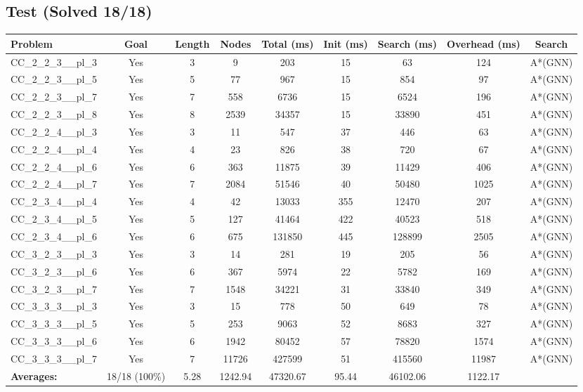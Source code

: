 \documentclass{article}
\begin{document}
\subsection*{Test (Solved 18/18)}
\begin{tabular}{lcccccccc}
\toprule
Problem & Goal & Length & Nodes & Total (ms) & Init (ms) & Search (ms) & Overhead (ms) & Search \\
\midrule
CC\_2\_2\_3\_\_pl\_3 & Yes & 3 & 9 & 203 & 15 & 63 & 124 & A*(GNN) \\
CC\_2\_2\_3\_\_pl\_5 & Yes & 5 & 77 & 967 & 15 & 854 & 97 & A*(GNN) \\
CC\_2\_2\_3\_\_pl\_7 & Yes & 7 & 558 & 6736 & 15 & 6524 & 196 & A*(GNN) \\
CC\_2\_2\_3\_\_pl\_8 & Yes & 8 & 2539 & 34357 & 15 & 33890 & 451 & A*(GNN) \\
CC\_2\_2\_4\_\_pl\_3 & Yes & 3 & 11 & 547 & 37 & 446 & 63 & A*(GNN) \\
CC\_2\_2\_4\_\_pl\_4 & Yes & 4 & 23 & 826 & 38 & 720 & 67 & A*(GNN) \\
CC\_2\_2\_4\_\_pl\_6 & Yes & 6 & 363 & 11875 & 39 & 11429 & 406 & A*(GNN) \\
CC\_2\_2\_4\_\_pl\_7 & Yes & 7 & 2084 & 51546 & 40 & 50480 & 1025 & A*(GNN) \\
CC\_2\_3\_4\_\_pl\_4 & Yes & 4 & 42 & 13033 & 355 & 12470 & 207 & A*(GNN) \\
CC\_2\_3\_4\_\_pl\_5 & Yes & 5 & 127 & 41464 & 422 & 40523 & 518 & A*(GNN) \\
CC\_2\_3\_4\_\_pl\_6 & Yes & 6 & 675 & 131850 & 445 & 128899 & 2505 & A*(GNN) \\
CC\_3\_2\_3\_\_pl\_3 & Yes & 3 & 14 & 281 & 19 & 205 & 56 & A*(GNN) \\
CC\_3\_2\_3\_\_pl\_6 & Yes & 6 & 367 & 5974 & 22 & 5782 & 169 & A*(GNN) \\
CC\_3\_2\_3\_\_pl\_7 & Yes & 7 & 1548 & 34221 & 31 & 33840 & 349 & A*(GNN) \\
CC\_3\_3\_3\_\_pl\_3 & Yes & 3 & 15 & 778 & 50 & 649 & 78 & A*(GNN) \\
CC\_3\_3\_3\_\_pl\_5 & Yes & 5 & 253 & 9063 & 52 & 8683 & 327 & A*(GNN) \\
CC\_3\_3\_3\_\_pl\_6 & Yes & 6 & 1942 & 80452 & 57 & 78820 & 1574 & A*(GNN) \\
CC\_3\_3\_3\_\_pl\_7 & Yes & 7 & 11726 & 427599 & 51 & 415560 & 11987 & A*(GNN) \\
\textbf{Averages:} & 18/18 (100\%) & 5.28 & 1242.94 & 47320.67 & 95.44 & 46102.06 & 1122.17 & \\
\bottomrule
\end{tabular}
\\[0.7cm]
\end{document}
